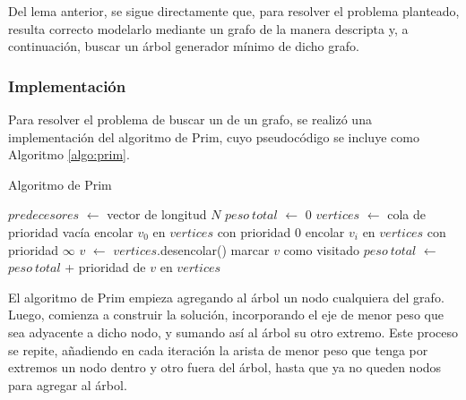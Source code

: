     Del lema anterior, se sigue directamente que, para resolver el problema
    planteado, resulta correcto modelarlo mediante un grafo de la manera
    descripta y, a continuación, buscar un árbol generador mínimo de dicho
    grafo.

    \subsubsection{Implementación}
    Para resolver el problema de buscar un  de un grafo,
    se realizó una implementación del algoritmo de Prim, cuyo pseudocódigo
    se incluye como Algoritmo \ref{algo:prim}.

    \begin{algorithm}
        \caption{Algoritmo de Prim}
        \label{algo:prim}

        $predecesores$ $\gets$ vector de longitud $N$ \;
        $peso\ total$ $\gets$ $0$ \;
        $vertices$ $\gets$ cola de prioridad vacía \;
        encolar $v_0$ en $vertices$ con prioridad $0$ \;
         {
            encolar $v_i$ en $vertices$ con prioridad $\infty$ \;
        }
         {
            $v$ $\gets$ $vertices$.desencolar() \;
            marcar $v$ como visitado \;
            $peso\ total$ $\gets$ $peso\ total$ + prioridad de $v$ en $vertices$ \;
        }
    \end{algorithm}

    El algoritmo de Prim empieza agregando al árbol un nodo cualquiera del
    grafo. Luego, comienza a construir la solución, incorporando el eje de
    menor peso que sea adyacente a dicho nodo, y sumando así al árbol su otro
    extremo. Este proceso se repite, añadiendo en cada iteración la arista de
    menor peso que tenga por extremos un nodo dentro y otro fuera del árbol,
    hasta que ya no queden nodos para agregar al árbol.

